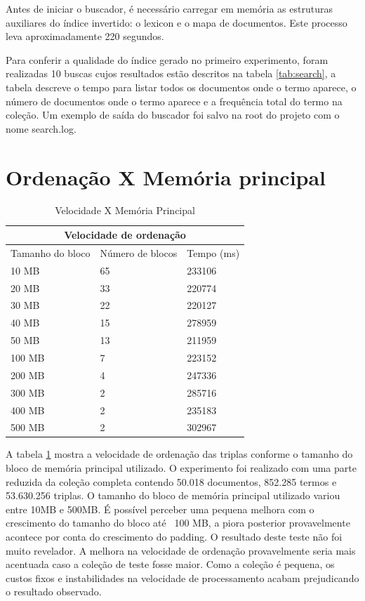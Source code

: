 \documentclass{report}
\begin{document}
Antes de iniciar o buscador, é necessário carregar em memória as estruturas auxiliares do índice invertido: o lexicon e o mapa de documentos. Este processo
leva aproximadamente 220 segundos.

Para conferir a qualidade do índice gerado no primeiro experimento, foram realizadas 10 buscas cujos resultados estão descritos
na tabela \ref{tab:search}, a tabela descreve o tempo para listar todos os documentos onde o termo aparece, o número de documentos onde o termo
aparece e a frequência total do termo na coleção. Um exemplo de saída do buscador foi salvo na root do projeto com o nome search.log.

\section{Ordenação X Memória principal}

\begin{table}
\centering
\begin{tabular}{ |l|l|l| }
  \hline
  \multicolumn{3}{|c|}{Velocidade de ordenação} \\
  \hline
  Tamanho do bloco & Número de blocos & Tempo (ms) \\
  \hline                             
  10 MB            & 65               & 233106 \\
  20 MB            & 33               & 220774 \\
  30 MB            & 22               & 220127 \\               
  40 MB            & 15               & 278959 \\               
  50 MB            & 13               & 211959 \\              
  100 MB           & 7                & 223152 \\               
  200 MB           & 4                & 247336 \\               
  300 MB           & 2                & 285716 \\               
  400 MB           & 2                & 235183 \\
  500 MB           & 2                & 302967 \\               
  \hline
\end{tabular}
\caption{Velocidade X Memória Principal}
\label{tab:sorter}
\end{table}

A tabela \ref{tab:sorter} mostra a velocidade de ordenação das triplas conforme o tamanho do bloco de memória principal utilizado. O experimento foi
realizado com uma parte reduzida da coleção completa contendo 50.018 documentos, 852.285 termos e 53.630.256 triplas. O tamanho do bloco de memória
principal utilizado variou entre 10MB e 500MB. É possível perceber uma pequena melhora com o crescimento do tamanho do bloco até ~100 MB, a piora
posterior provavelmente acontece por conta do crescimento do padding. O resultado deste teste não foi muito revelador. A melhora na velocidade de 
ordenação provavelmente seria mais acentuada caso a coleção de teste fosse maior. Como a coleção é pequena, os custos fixos e instabilidades na 
velocidade de processamento acabam prejudicando o resultado observado.
\end{document}
